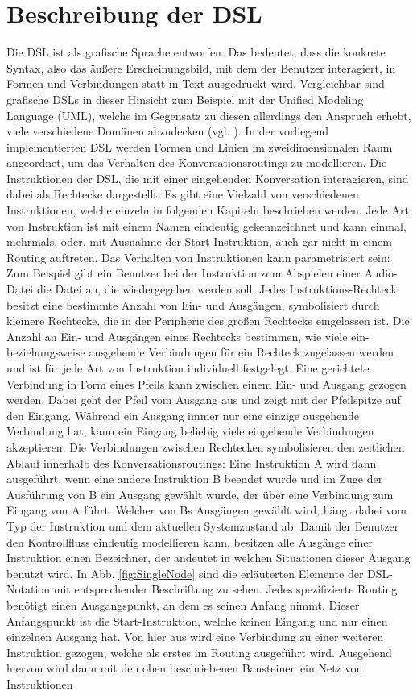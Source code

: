 \section{Beschreibung der DSL}
Die DSL ist als grafische Sprache entworfen. Das bedeutet, dass die konkrete Syntax, also das äußere Erscheinungsbild, mit dem der Benutzer interagiert, in Formen und Verbindungen statt in Text ausgedrückt wird. Vergleichbar sind grafische DSLs in dieser Hinsicht zum Beispiel mit der Unified Modeling Language (UML), welche im Gegensatz zu diesen allerdings den Anspruch erhebt, viele verschiedene Domänen abzudecken (vgl. \cite[S. 17]{Booch:05}).
\newline 
In der vorliegend implementierten DSL werden Formen und Linien im zweidimensionalen Raum angeordnet, um das Verhalten des Konversationsroutings zu modellieren. Die Instruktionen der DSL, die mit einer eingehenden Konversation interagieren, sind dabei als Rechtecke dargestellt. Es gibt eine Vielzahl von verschiedenen Instruktionen, welche einzeln in folgenden Kapiteln beschrieben werden. Jede Art von  Instruktion ist mit einem Namen eindeutig gekennzeichnet und kann einmal, mehrmals, oder, mit Ausnahme der Start-Instruktion, auch gar nicht in einem Routing auftreten. Das Verhalten von Instruktionen kann parametrisiert sein: Zum Beispiel gibt ein Benutzer bei der Instruktion zum Abspielen einer Audio-Datei die Datei an, die wiedergegeben werden soll. Jedes Instruktions-Rechteck besitzt eine bestimmte Anzahl von Ein- und Ausgängen, symbolisiert durch kleinere Recht\-ecke, die in der Peripherie des großen Rechtecks eingelassen ist. Die Anzahl an Ein- und Ausgängen eines Rechtecks bestimmen, wie viele ein- beziehungsweise ausgehende Verbindungen für ein Rechteck zugelassen werden und ist für jede Art von Instruktion individuell festgelegt. Eine gerichtete Verbindung in Form eines Pfeils kann zwischen einem Ein- und Ausgang gezogen werden. Dabei geht der Pfeil vom Ausgang aus und zeigt mit der Pfeilspitze auf den Eingang. Während ein Ausgang immer nur eine einzige ausgehende Verbindung hat, kann ein Eingang beliebig viele eingehende Verbindungen akzeptieren. Die Verbindungen zwischen Rechtecken symbolisieren den zeitlichen Ablauf innerhalb des Konversationsroutings: Eine Instruktion A wird dann ausgeführt, wenn eine andere Instruktion B beendet wurde und im Zuge der Ausführung von B ein Ausgang gewählt wurde, der über eine Verbindung zum Eingang von A führt. Welcher von Bs Ausgängen gewählt wird, hängt dabei vom Typ der Instruktion und dem aktuellen Systemzustand ab. Damit der Benutzer den Kontrollfluss eindeutig modellieren kann, besitzen alle Ausgänge einer Instruktion einen Bezeichner, der andeutet in welchen Situationen dieser Ausgang benutzt wird.  In Abb. \ref{fig:SingleNode} sind die erläuterten Elemente der DSL-Notation mit entsprechender Beschriftung zu sehen. Jedes spezifizierte Routing benötigt einen Ausgangspunkt, an dem es seinen Anfang nimmt. Dieser Anfangspunkt ist die Start-Instruktion, welche keinen Eingang und nur einen einzelnen Ausgang hat. Von hier aus wird eine Verbindung zu einer weiteren Instruktion gezogen, welche als erstes im Routing ausgeführt wird. Ausgehend hiervon wird dann mit den oben beschriebenen Bausteinen ein Netz von Instruktionen 